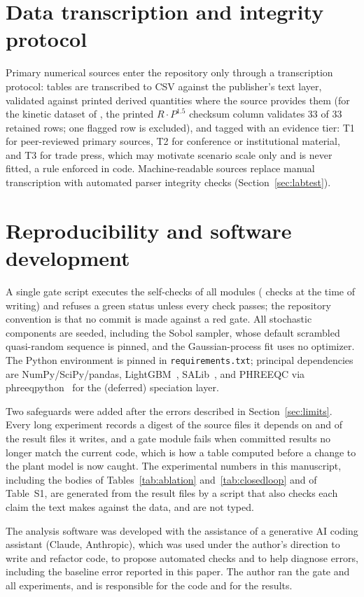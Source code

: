 \section{Data transcription and integrity protocol}\label{app:protocol}
Primary numerical sources enter the repository only through a
transcription protocol: tables are transcribed to CSV against the
publisher's text layer, validated against printed derived quantities
where the source provides them (for the kinetic dataset of
\citet{rothbaum1979rohde}, the printed $R \cdot P^{1.5}$ checksum column
validates 33 of 33 retained rows; one flagged row is excluded), and
tagged with an evidence tier: T1 for peer-reviewed primary sources, T2
for conference or institutional material, and T3 for trade press, which
may motivate scenario scale only and is never fitted, a rule enforced
in code. Machine-readable sources replace manual transcription with
automated parser integrity checks (Section~\ref{sec:labtest}).

\section{Reproducibility and software development}\label{app:repro}
A single gate script executes the self-checks of all 
modules ( checks at the time of writing) and refuses a
green status unless every check passes; the repository convention is
that no commit is made against a red gate. All stochastic components
are seeded, including the Sobol sampler, whose default scrambled
quasi-random sequence is pinned, and the Gaussian-process fit uses no
optimizer. The Python environment is pinned in
\texttt{requirements.txt}; principal dependencies are
NumPy/SciPy/pandas, LightGBM~\citep{ke2017lightgbm},
SALib~\citep{herman2017salib}, and PHREEQC via
phreeqpython~\citep{parkhurst2013phreeqc} for the (deferred) speciation
layer.

Two safeguards were added after the errors described in
Section~\ref{sec:limits}. Every long experiment records a digest of the
source files it depends on and of the result files it writes, and a
gate module fails when committed results no longer match the current
code, which is how a table computed before a change to the plant model
is now caught. The experimental numbers in this manuscript, including
the bodies of Tables~\ref{tab:ablation} and~\ref{tab:closedloop} and of
Table~S1, are generated from the result files by a script that also
checks each claim the text makes against the data, and are not typed.

The analysis software was developed with the assistance of a
generative AI coding assistant (Claude, Anthropic), which was used
under the author's direction to write and refactor code, to propose
automated checks and to help diagnose errors, including the baseline
error reported in this paper. The author ran the gate and all
experiments, and is responsible for the code and for the results.
